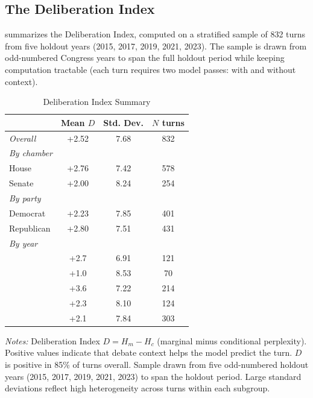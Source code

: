 \documentclass[12pt]{article}
\newcommand{\Hc}{H_c}
\newcommand{\Hm}{H_m}
\newcommand{\DI}{\mathit{D}}
\begin{document}
\subsection{The Deliberation Index}

 summarizes the Deliberation Index, computed on a stratified sample of 832 turns from five holdout years (2015, 2017, 2019, 2021, 2023). The sample is drawn from odd-numbered Congress years to span the full holdout period while keeping computation tractable (each turn requires two model passes: with and without context).

\begin{table}[H]
\centering
\caption{Deliberation Index Summary}
\label{tab:deliberation}
\begin{threeparttable}
\begin{tabular}{lccc}
\toprule
& Mean $\DI$ & Std. Dev. & $N$ turns \\
\midrule
\textit{Overall} & +2.52 & 7.68 & 832 \\
\midrule
\textit{By chamber} \\
\quad House & +2.76 & 7.42 & 578 \\
\quad Senate & +2.00 & 8.24 & 254 \\
\midrule
\textit{By party} \\
\quad Democrat & +2.23 & 7.85 & 401 \\
\quad Republican & +2.80 & 7.51 & 431 \\
\midrule
\textit{By year} \\
\quad 2015 & +2.7 & 6.91 & 121 \\
\quad 2017 & +1.0 & 8.53 & 70 \\
\quad 2019 & +3.6 & 7.22 & 214 \\
\quad 2021 & +2.3 & 8.10 & 124 \\
\quad 2023 & +2.1 & 7.84 & 303 \\
\bottomrule
\end{tabular}
\begin{tablenotes}[flushleft]
\small
\item \textit{Notes:} Deliberation Index $\DI = \Hm - \Hc$ (marginal minus conditional perplexity). Positive values indicate that debate context helps the model predict the turn. $\DI$ is positive in 85\% of turns overall. Sample drawn from five odd-numbered holdout years (2015, 2017, 2019, 2021, 2023) to span the holdout period. Large standard deviations reflect high heterogeneity across turns within each subgroup.
\end{tablenotes}
\end{threeparttable}
\end{table}
\end{document}
